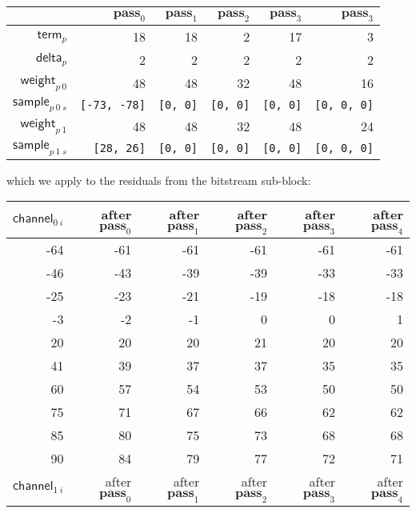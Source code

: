 {\begin{table}[h]
{
  \begin{tabular}{|r|r|r|r|r|r|}
    \hline
    & $\textbf{pass}_0$ & $\textbf{pass}_1$ & $\textbf{pass}_2$ &
    $\textbf{pass}_3$ & $\textbf{pass}_3$ \\
    \hline
    $\textsf{term}_p$ & 18 & 18 & 2 & 17 & 3 \\
    $\textsf{delta}_p$ & 2 & 2 & 2 & 2 & 2 \\
    $\textsf{weight}_{p~0}$ & 48 & 48 & 32 & 48 & 16 \\
    $\textsf{sample}_{p~0~s}$ & \texttt{[-73, -78]} & \texttt{[0, 0]} &
    \texttt{[0, 0]} & \texttt{[0, 0]} & \texttt{[0, 0, 0]} \\
    $\textsf{weight}_{p~1}$ & 48 & 48 & 32 & 48 & 24 \\
    $\textsf{sample}_{p~1~s}$ & \texttt{[28, 26]} & \texttt{[0, 0]} &
    \texttt{[0, 0]} & \texttt{[0, 0]} & \texttt{[0, 0, 0]} \\
    \hline
  \end{tabular}
}
\end{table}
\par
\noindent
which we apply to the residuals from the bitstream sub-block:
\par
\noindent
{
  \begin{tabular}{|r|r|r|r|r|r|}
    \hline
    $\textsf{channel}_{0~i}$ &
    after $\textbf{pass}_0$ &
    after $\textbf{pass}_1$ &
    after $\textbf{pass}_2$ &
    after $\textbf{pass}_3$ &
    after $\textbf{pass}_4$ \\
    \hline
    -64 & -61 & -61 & -61 & -61 & -61 \\
    -46 & -43 & -39 & -39 & -33 & -33 \\
    -25 & -23 & -21 & -19 & -18 & -18 \\
    -3 & -2 & -1 & 0 & 0 & 1 \\
    20 & 20 & 20 & 21 & 20 & 20 \\
    41 & 39 & 37 & 37 & 35 & 35 \\
    60 & 57 & 54 & 53 & 50 & 50 \\
    75 & 71 & 67 & 66 & 62 & 62 \\
    85 & 80 & 75 & 73 & 68 & 68 \\
    90 & 84 & 79 & 77 & 72 & 71 \\
    \hline
    \hline
    $\textsf{channel}_{1~i}$ &
    after $\textbf{pass}_0$ &
    after $\textbf{pass}_1$ &
    after $\textbf{pass}_2$ &
    after $\textbf{pass}_3$ &
    after $\textbf{pass}_4$ \\

\end{tabular}}}
